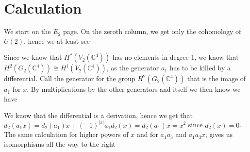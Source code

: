 

\section{Calculation}

We start on the $E_2$ page. 
On the zeroth column, we get only the cohomology of $U(2)$, hence we at least see


Since we know that $H^*(V_2(\mathbb{C}^4))$ has no elements in degree $1$, 
we know that $H^2(G_2(\mathbb{C}^4))\cong H^1(V_2(\mathbb{C}^4))$, 
as the generator $a_1$ has to be killed by a differential. 
Call the generator for the group $H^2(G_2(\mathbb{C}^4))$ that is the image of $a_1$ for $x$. 
By multiplications by the other generators and itself we then know we have


We know that the differential is a derivation, 
hence we get that $d_2(a_1x)=d_2(a_1)x+(-1)^{|x|}a_1d_2(x) = d_2(a_1)x = x^2$ since $d_2(x)=0$. 
The same calculation for higher powers of $x$ and for $a_1a_3$ and $a_1a_3x$, 
gives us isomorphisms all the way to the right

